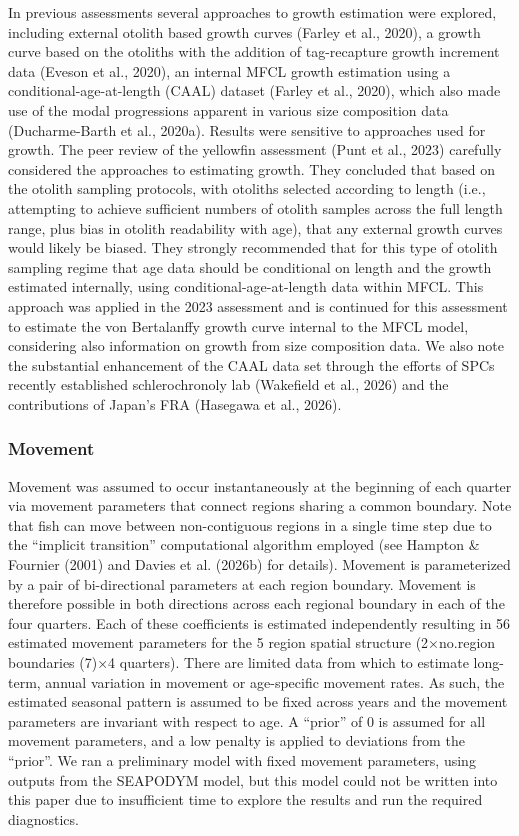 \documentclass[
  english,
  a4paper,
  a4paper,
  11pt]{SCreport}
\begin{document}
In previous assessments several approaches to growth estimation were
explored, including external otolith based growth curves (Farley et al.,
2020), a growth curve based on the otoliths with the addition of
tag-recapture growth increment data (Eveson et al., 2020), an internal
MFCL growth estimation using a conditional-age-at-length (CAAL) dataset
(Farley et al., 2020), which also made use of the modal progressions
apparent in various size composition data (Ducharme-Barth et al.,
2020a). Results were sensitive to approaches used for growth. The peer
review of the yellowfin assessment (Punt et al., 2023) carefully
considered the approaches to estimating growth. They concluded that
based on the otolith sampling protocols, with otoliths selected
according to length (i.e., attempting to achieve sufficient numbers of
otolith samples across the full length range, plus bias in otolith
readability with age), that any external growth curves would likely be
biased. They strongly recommended that for this type of otolith sampling
regime that age data should be conditional on length and the growth
estimated internally, using conditional-age-at-length data within MFCL.
This approach was applied in the 2023 assessment and is continued for
this assessment to estimate the von Bertalanffy growth curve internal to
the MFCL model, considering also information on growth from size
composition data. We also note the substantial enhancement of the CAAL
data set through the efforts of SPCs recently established
schlerochronoly lab (Wakefield et al., 2026) and the contributions of
Japan's FRA (Hasegawa et al., 2026).

\subsubsection{Movement}\label{sec-model-movement}

Movement was assumed to occur instantaneously at the beginning of each
quarter via movement parameters that connect regions sharing a common
boundary. Note that fish can move between non-contiguous regions in a
single time step due to the ``implicit transition'' computational
algorithm employed (see Hampton \& Fournier (2001) and Davies et al.
(2026b) for details). Movement is parameterized by a pair of
bi-directional parameters at each region boundary. Movement is therefore
possible in both directions across each regional boundary in each of the
four quarters. Each of these coefficients is estimated independently
resulting in 56 estimated movement parameters for the 5 region spatial
structure (2×no.region boundaries (7)×4 quarters). There are limited
data from which to estimate long-term, annual variation in movement or
age-specific movement rates. As such, the estimated seasonal pattern is
assumed to be fixed across years and the movement parameters are
invariant with respect to age. A ``prior'' of 0 is assumed for all
movement parameters, and a low penalty is applied to deviations from the
``prior''. We ran a preliminary model with fixed movement parameters,
using outputs from the SEAPODYM model, but this model could not be
written into this paper due to insufficient time to explore the results
and run the required diagnostics.
\end{document}
